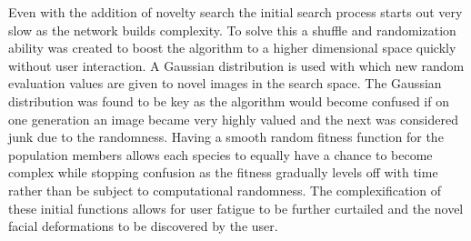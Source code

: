 Even with the addition of novelty search the initial search process starts out very slow as the network builds complexity. To solve this 
a shuffle and randomization ability was created to boost the algorithm to a higher dimensional space quickly without user interaction.
A Gaussian distribution is used with which new random evaluation values are given to novel images in the search space. The Gaussian
distribution was found to be key as the algorithm would become confused if on one generation an image became very highly valued and the next
was considered junk due to the randomness. Having a smooth random fitness function for the population members allows each species to equally
have a chance to become complex while stopping confusion as the fitness gradually levels off with time rather than be subject to computational
randomness. The complexification of these initial functions allows for user fatigue to be further curtailed and the novel facial 
deformations to be discovered by the user.



